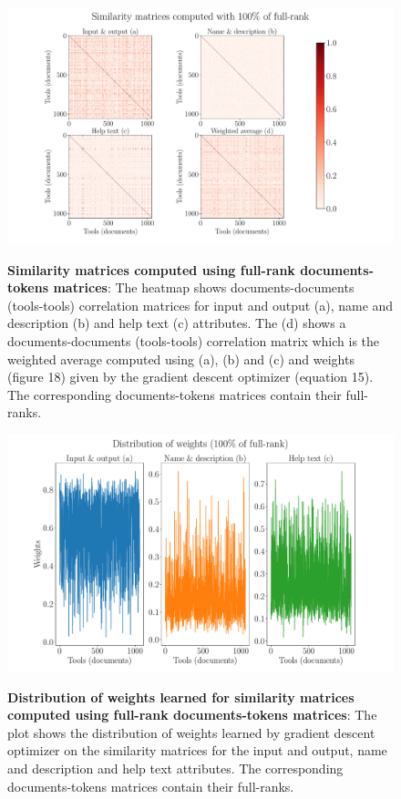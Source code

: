 \begin{figure}[h]
\begin{centering}
    {\includegraphics[scale=0.4]{figures/Similarity_matrices_100.pdf}}
    \caption[Similarity matrices computed using full-rank document-tokens matrices]{\textbf{Similarity matrices computed using full-rank documents-tokens matrices}: The heatmap shows documents-documents (tools-tools) correlation matrices for input and output (a), name and description (b) and help text (c) attributes. The (d) shows a documents-documents (tools-tools) correlation matrix which is the weighted average computed using (a), (b) and (c) and weights (figure 18) given by the gradient descent optimizer (equation 15). The corresponding documents-tokens matrices contain their full-ranks. }
\end{centering}
\end{figure}

\begin{figure}[h]
\begin{centering}
    {\includegraphics[scale=0.35]{figures/Weights_100.pdf}}
    \caption[Distribution of weights learned for similarity matrices computed using full-rank documents-tokens matrices]{\textbf{Distribution of weights learned for similarity matrices computed using full-rank documents-tokens matrices}: The plot shows the distribution of weights learned by gradient descent optimizer on the similarity matrices for the input and output, name and description and help text attributes. The corresponding documents-tokens matrices contain their full-ranks.}
\end{centering}
\end{figure}

